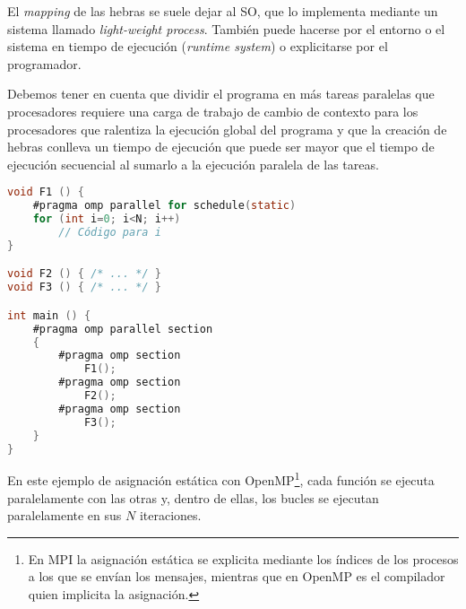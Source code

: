 El \textit{mapping} de las hebras se suele dejar al SO, que lo implementa mediante un sistema llamado \textit{light-weight process}.
También puede hacerse por el entorno o el sistema en tiempo de ejecución (\textit{runtime system}) o explicitarse por el programador.

Debemos tener en cuenta que dividir el programa en más tareas paralelas que procesadores requiere una carga de trabajo de cambio de contexto para los procesadores que ralentiza la ejecución global del programa y que la creación de hebras conlleva un tiempo de ejecución que puede ser mayor que el tiempo de ejecución secuencial al sumarlo a la ejecución paralela de las tareas.

\begin{lstlisting}[language=C]
void F1 () {
	#pragma omp parallel for schedule(static)
	for (int i=0; i<N; i++)
		// Código para i
}

void F2 () { /* ... */ }
void F3 () { /* ... */ }

int main () {
	#pragma omp parallel section
	{
		#pragma omp section
			F1();
		#pragma omp section
			F2();
		#pragma omp section
			F3();
	}
}
\end{lstlisting}

En este ejemplo de asignación estática con OpenMP\footnote{En MPI la asignación estática se explicita mediante los índices de los procesos a los que se envían los mensajes, mientras que en OpenMP es el compilador quien implicita la asignación.}, cada función  se ejecuta paralelamente con las otras y, dentro de ellas, los bucles  se ejecutan paralelamente en sus $N$ iteraciones.

